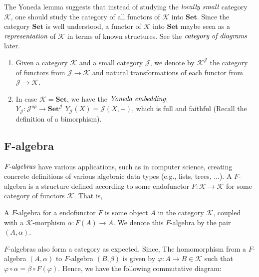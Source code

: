 \documentclass[10pt, oneside, reqno]{amsart}
\begin{document}
\begin{defn}
The Yoneda lemma suggests that instead of studying the $\emph{locally small}$ category $\mathcal{K}$,
one should study the category of all functors of $\mathcal{K}$ into $\textbf{Set}$.
Since the category $\textbf{Set}$ is well understood, a functor of $\mathcal{K}$ into $\textbf{Set}$
maybe seen as a $\emph{representation}$ of $\mathcal{K}$ in terms of known structures.
See the $\emph{category of diagrams}$ later.
 \begin{enumerate}
  \item Given a category $\mathcal{K}$ and a small category $\mathcal{J}$, we denote by
  $\mathcal{K}^\mathcal{J}$ the category of functors from $\mathcal{J} \to \mathcal{K}$ and natural transformations
  of each functor from $\mathcal{J} \to \mathcal{K}$.
  \item In case $\mathcal{K} = \textbf{Set}$, we have the $\emph{Yoneda embedding}$:\\
  $Y_{\mathcal{J}}: \mathcal{J}^{op} \to \textbf{Set}^{\mathcal{J}}
  \, \,
  Y_{\mathcal{J}}(X) = \mathcal{J}(X, -)$, which is full and faithful (Recall the definition of a bimorphism).
 \end{enumerate}
\end{defn}


\subsection{F-algebra} %
\label{subsec:f-algebra}
$\emph{F-algebras}$ have various applications, such as in computer science,
creating concrete definitions of various algebraic data types (e.g., lists, trees, ...).
A $F$-algebra is a structure defined according to some endofunctor $F: \mathcal{K} \to \mathcal{K}$
for some category of functors $\mathcal{K}$. That is,

\begin{defn}[F-algebra]
 A $F$-algebra for a endofunctor $F$ is some object $A$ in the category $\mathcal{K}$, coupled with
 a $\mathcal{K}$-morphism $\alpha: F(A) \to A$. We denote this $F$-algebra by the pair $(A, \alpha)$.
\end{defn}

$F$-algebras also form a category as expected.
Since, The homomorphism from a $F$-algebra $(A, \alpha)$ to $F$-algebra $(B, \beta)$
is given by $\varphi: A \to B \in \mathcal{K}$ such that $\varphi \circ \alpha = \beta \circ F(\varphi)$.
Hence, we have the following commutative diagram:
\end{document}
